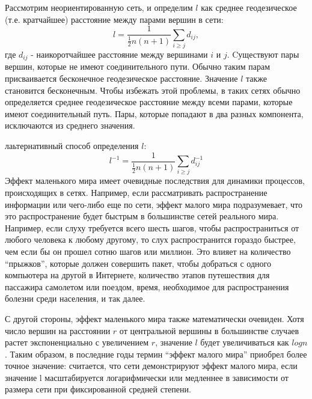 \documentclass[a4paper]{article}
\begin{document}
Рассмотрим неориентированную сеть, и определим $l$ как среднее геодезическое (т.е. кратчайшее) расстояние между парами вершин в сети: $$ l = \frac{1}{\frac{1}{2}n(n+1)}\sum_{i \geq j}d_{ij},$$ где $d_{ij}$ - наикоротчайшее расстояние между вершинами $i$ и $j$.
Cуществуют пары вершин, которые не имеют соединительного пути. Обычно таким парам присваивается бесконечное геодезическое расстояние. Значение $l$ также становится бесконечным. Чтобы избежать этой проблемы, в таких сетях обычно определяется среднее геодезическое 
расстояние между всеми парами, которые имеют соединительный путь. Пары, которые попадают в два разных компонента, исключаются из среднего значения. 

лаьтернативный способ определения $l$: $$l^{-1} = \frac{1}{\frac{1}{2}n(n+1)}\sum_{i \geq j}d_{ij}^{-1}$$
Эффект маленького мира имеет очевидные последствия для динамики процессов, происходящих в сетях.
 Например, если рассматривать распространение информации или чего-либо еще по сети, эффект малого 
 мира подразумевает, что это распространение будет быстрым в большинстве сетей реального мира. 
 Например, если слуху требуется всего шесть шагов, чтобы распространиться от любого человека к 
 любому другому, то слух распространится гораздо быстрее, чем если бы он прошел сотню шагов или миллион. 
 Это влияет на количество “прыжков”, которые должен совершить пакет, чтобы добраться с одного компьютера
  на другой в Интернете, количество этапов путешествия для пассажира самолетом или поездом, время,
   необходимое для распространения болезни среди населения, и так далее. 

С другой стороны, эффект маленького мира также математически очевиден. Хотя число вершин на расстоянии $r$
от центральной вершины в большинстве случаев растет экспоненциально с увеличением $r$, значение $l$ будет увеличиваться как $logn$. Таким образом, в последние годы термин “эффект малого мира” приобрел 
более точное значение: считается, что сети демонстрируют эффект малого мира, если значение l 
   масштабируется логарифмически или медленнее в зависимости от размера сети при фиксированной средней 
   степени. 
   
\end{document}
